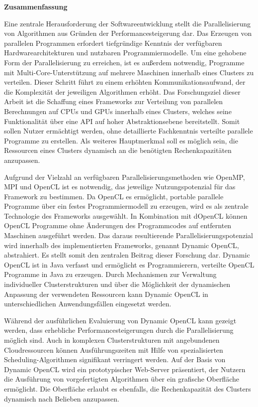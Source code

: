 \begin{center}\textsf{\textbf{Zusammenfassung}}\end{center}

\noindent Eine zentrale Herausforderung der Softwareentwicklung stellt die Parallelisierung von Algorithmen aus Gründen der Performancesteigerung dar. Das Erzeugen von parallelen Programmen erfordert tiefgründige Kenntnis der verfügbaren Hardwarearchitekturen und nutzbaren Programmiermodelle. Um eine gehobene Form der Parallelisierung zu erreichen, ist es außerdem notwendig, Programme mit Multi-Core-Unterstützung auf mehrere Maschinen innerhalb eines Clusters zu verteilen. Dieser Schritt führt zu einem erhöhten Kommunikationsaufwand, der die Komplexität der jeweiligen Algorithmen erhöht. Das Forschungsziel dieser Arbeit ist die Schaffung eines Frameworks zur Verteilung von parallelen Berechnungen auf CPUs und GPUs innerhalb eines Clusters, welches seine Funktionalität über eine API auf hoher Abstraktionsebene bereitstellt. Somit sollen Nutzer ermächtigt werden, ohne detaillierte Fachkenntnis verteilte parallele Programme zu erstellen. Als weiteres Hauptmerkmal soll es möglich sein, die Ressourcen eines Clusters dynamisch an die benötigten Rechenkapazitäten anzupassen.

Aufgrund der Vielzahl an verfügbaren Parallelisierungsmethoden wie OpenMP, MPI und OpenCL ist es notwendig, das jeweilige Nutzungspotenzial für das Framework zu bestimmen. Da OpenCL es ermöglicht, portable parallele Programme über ein festes Programmiermodell zu erzeugen, wird es als zentrale Technologie des Frameworks ausgewählt. In Kombination mit dOpenCL können OpenCL Programme ohne Änderungen des Programmcodes auf entfernten Maschinen ausgeführt werden. Das daraus resultierende Parallelisierungspotenzial wird innerhalb des implementierten Frameworks, genannt Dynamic OpenCL, abstrahiert. Es stellt somit den zentralen Beitrag dieser Forschung dar. Dynamic OpenCL ist in Java verfasst und ermöglicht es Programmierern, verteilte OpenCL Programme in Java zu erzeugen. Durch Mechanismen zur Verwaltung individueller Clusterstrukturen und über die Möglichkeit der dynamischen Anpassung der verwendeten Ressourcen kann Dynamic OpenCL in unterschiedlichen Anwendungsfällen eingesetzt werden.

Während der ausführlichen Evaluierung von Dynamic OpenCL kann gezeigt werden, dass erhebliche Performancesteigerungen durch die Parallelisierung möglich sind. Auch in komplexen Clusterstrukturen mit angebundenen Cloudressourcen können Ausführungszeiten mit Hilfe von spezialisierten Scheduling-Algorithmen signifikant verringert werden. Auf der Basis von Dynamic OpenCL wird ein prototypischer Web-Server präsentiert, der Nutzern die Ausführung von vorgefertigten Algorithmen über ein grafische Oberfläche ermöglicht. Die Oberfläche erlaubt es ebenfalls, die Rechenkapazität des Clusters dynamisch nach Belieben anzupassen.

